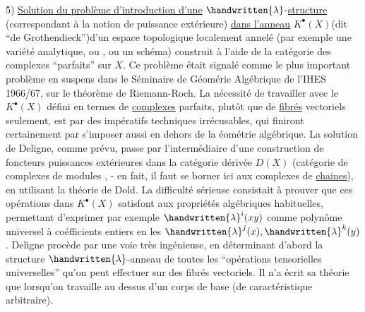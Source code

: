 5) \uline{Solution du problème d'introduction d'une} $\handwritten{\lambda}$-\uline{structure} (correspondant à la notion de puissance extérieure) \uline{dans l'anneau} $K^\bullet(X)$(dit ``de Grothendieck'')d'un espace topologique localement annelé (par exemple une variété analytique, ou , ou un schéma)\handwritten{,} construit à l'aide de la catégorie des complexes ``parfaits'' sur $X$. Ce problème était signalé comme le plus important problème  en suspens dans le Séminaire de Géomérie Algébrique de l'IHES 1966/67, sur le théorème de Riemann-Roch. La nécessité de travailler avec le $K^\bullet(X)$ défini en termes de \uline{complexes} parfaits, plutôt que de \uline{fibrés} vectoriels seulement, est  par des  impératifs techniques irrécusables, qui finiront certainement par s'imposer aussi en dehors de la éométrie algébrique. La solution de Deligne, comme prévu, passe par l'intermédiaire d'une construction de  foncteurs puissances extérieures dans la catégorie dérivée $D(X)$ (catégorie de complexes de modules , - en fait, il faut se borner ici aux complexes de \uline{chaines}), en utilisant la théorie de Dold. La difficulté sérieuse consistait à prouver que ces opérations dans $K^\bullet(X)$ satisfont aux propriétés algébriques habituelles, permettant d'exprimer par exemple $\handwritten{\lambda}^i(xy)$ comme polynôme universel à coéfficients entiers en les $\handwritten{\lambda}^j(x),\handwritten{\lambda}^k(y)$. Deligne procède par une voie très ingénieuse, en déterminant d'abord la structure  $\handwritten{\lambda}$-anneau de toutes les ``opérations tensorielles universelles'' qu'on peut effectuer sur des fibrés vectoriels. Il n'a écrit sa théorie que lorsqu'on travaille au dessus d'un corps de base (de caractéristique arbitraire). 

